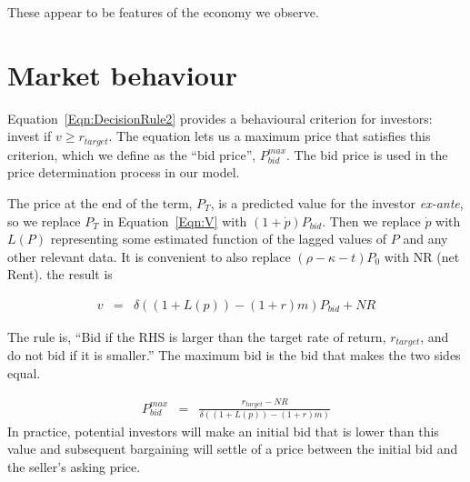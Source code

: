 These appear to be features of the economy we observe.

\section{Market behaviour}
Equation~\ref{Eqn:DecisionRule2} provides a behavioural criterion for investors: invest if $v \geq r_{target}$. The equation lets us a  maximum price that satisfies this criterion, which we define as the ``bid price'', $P^{max}_{bid}$. The bid price is used in the price determination process in our model. 


The  price at the end of the term,  $P_T$, is a predicted value  for the investor \textit{ex-ante}, so we replace $P_T$ in Equation~\ref{Eqn:V} with $(1+\dot p)P_{bid}$. Then we replace $\dot p$ with $L(P)$ representing some estimated function of the lagged values of $P$ and any  other relevant data. It is  convenient to also replace $(\rho -\kappa- t)P_0$ with NR (net Rent). the result is 



\begin{eqnarray}
v %
  &=&\delta\left( (1+L(p)) - (1+r)m \right) P_{bid} + NR  \nonumber
\end{eqnarray}

The rule is, ``Bid if the RHS is larger than the target rate of return, $r_{target}$, and do not bid if it is smaller.''  The maximum bid  is the bid that makes the two sides equal. 


\begin{eqnarray}
   P^{max}_{bid} &=&\frac{r_{target}-NR}{\delta\left( (1+L(p)) - (1+r)m \right)} \label{EqBidPrice} 
\end{eqnarray}
In practice, potential investors will make an  initial  bid that is lower than this value and subsequent bargaining will settle of a price between the initial bid and the seller's asking price.


